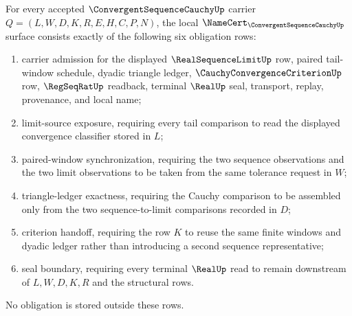 \begin{theorem}\label{thm:convergent-sequence-cauchy-namecert-obligations}
For every accepted $\ConvergentSequenceCauchyUp$ carrier $Q=(L,W,D,K,R,E,H,C,P,N)$, the local $\NameCert_{\ConvergentSequenceCauchyUp}$ surface consists exactly of the following six obligation rows:
\begin{enumerate}
\item carrier admission for the displayed $\RealSequenceLimitUp$ row, paired tail-window schedule, dyadic triangle ledger, $\CauchyConvergenceCriterionUp$ row, $\RegSeqRatUp$ readback, terminal $\RealUp$ seal, transport, replay, provenance, and local name;
\item limit-source exposure, requiring every tail comparison to read the displayed convergence classifier stored in $L$;
\item paired-window synchronization, requiring the two sequence observations and the two limit observations to be taken from the same tolerance request in $W$;
\item triangle-ledger exactness, requiring the Cauchy comparison to be assembled only from the two sequence-to-limit comparisons recorded in $D$;
\item criterion handoff, requiring the row $K$ to reuse the same finite windows and dyadic ledger rather than introducing a second sequence representative;
\item seal boundary, requiring every terminal $\RealUp$ read to remain downstream of $L,W,D,K,R$ and the structural rows.
\end{enumerate}
No obligation is stored outside these rows.
\end{theorem}
